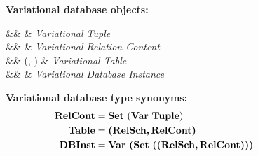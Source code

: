 \begin{figure}
%
\textbf{Variational database objects:}
\begin{syntax}
%
\synDef \vTuple {\vartype \tupletype} &\eqq&  & \textit{Variational Tuple}\\
\synDef \vRelCont \vRelContSet &\eqq& \setDef {\vi \vTuple \numTuples} & \textit{Variational Relation Content}\\
\synDef \vTab \tabletype &\eqq& (\vRelSch, \vRelCont) & \textit{Variational Table}\\
\synDef \vdbInst \vdbInstSet &\eqq& \annot [\dimMeta] {\setDef {\vi \vTab \numRels} } & \textit{Variational Database Instance}
\end{syntax}

\medskip
\textbf{Variational database type synonyms:}
\begin{alignat*}{1}
\vRelContSet &= \settype {(\vartype \tupletype)}\\
\tabletype &= \typepair{\vRelSchSet} {\vRelContSet}\\
\vdbInstSet &= \vartype {\bm{(} \settype {\bm{(}\typepair \relschtype\relconttype\bm{)}}\bm{)}}
\end{alignat*}


\end{figure}
